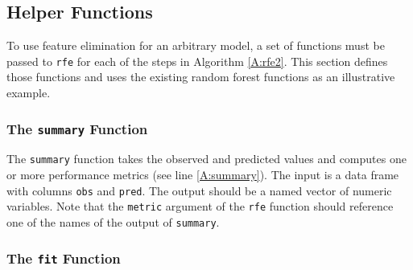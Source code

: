 \documentclass[12pt]{article}
\begin{document}
\subsection{Helper Functions}\label{S:helpers}

To use feature elimination for an arbitrary model, a set of functions must be passed to \texttt{rfe} for each of the steps in Algorithm  \ref{A:rfe2}. This section defines those functions and uses the existing random forest functions as an illustrative example.

\subsubsection{The \texttt{summary} Function}\label{S:summary}

The \texttt{summary} function takes the observed and predicted values and computes one or more performance metrics (see line \ref{A:summary}). The input is a data frame with columns \texttt{obs} and \texttt{pred}. The output should be a named vector of numeric variables. Note that the \texttt{metric} argument of the \texttt{rfe} function should reference one of the names of the output of \texttt{summary}.

\subsubsection{The \texttt{fit} Function}\label{S:fit}
\end{document}
